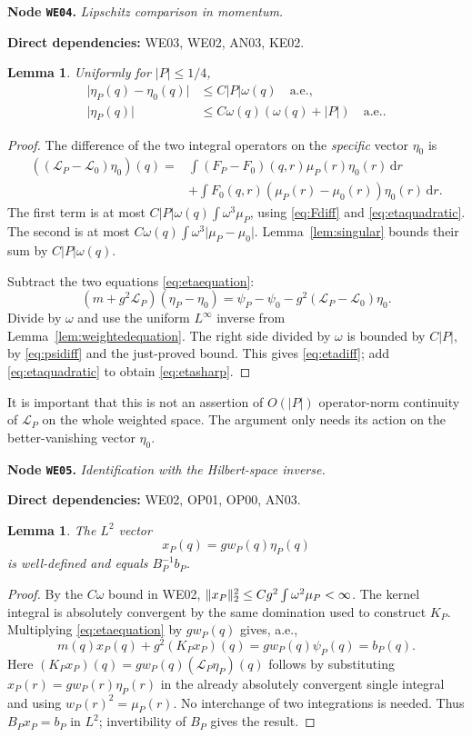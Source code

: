 \documentclass[11pt,a4paper]{article}
\newtheorem{lemma}[theorem]{Lemma}
\theoremstyle{remark}\newtheorem{remark}[theorem]{Remark}
\newcommand{\abs}[1]{\lvert #1\rvert}\newcommand{\rankone}[2]{\lvert #1\rangle\langle #2\rvert}
\newcommand{\dd}{\,\mathrm d}\newcommand{\almosteverywhere}{\text{a.e.}}
\newcommand{\node}[3]{\par\Needspace{6\baselineskip}\smallskip\hypertarget{node:#1}{}\label{nodepage:#1}\noindent\textbf{Node \texttt{#1}.} \textit{#2.}\par\noindent\textbf{Direct dependencies:} #3.\par}
\begin{document}
\node{WE04}{Lipschitz comparison in momentum}{WE03, WE02, AN03, KE02}
\begin{lemma}\label{lem:etacomparison}
Uniformly for $\abs P\leq1/4$,
\begin{align}
 \abs{\eta_P(q)-\eta_0(q)}&\leq C\abs P\omega(q)\quad\almosteverywhere,\label{eq:etadiff}\\
 \abs{\eta_P(q)}&\leq C\omega(q)(\omega(q)+\abs P)\quad\almosteverywhere.\label{eq:etasharp}
\end{align}
\end{lemma}
\begin{proof}
The difference of the two integral operators on the \emph{specific} vector $\eta_0$ is
\begin{align*}
 ((\mathcal L_P-\mathcal L_0)\eta_0)(q)
 ={}&\int(F_P-F_0)(q,r)\mu_P(r)\eta_0(r)\dd r\\
 &+\int F_0(q,r)(\mu_P(r)-\mu_0(r))\eta_0(r)\dd r.
\end{align*}
The first term is at most $C\abs P\omega(q)\int\omega^3\mu_P$, using \eqref{eq:Fdiff} and \eqref{eq:etaquadratic}. The second is at most $C\omega(q)\int\omega^3\abs{\mu_P-\mu_0}$. Lemma~\ref{lem:singular} bounds their sum by $C\abs P\omega(q)$.

Subtract the two equations \eqref{eq:etaequation}:
\[
 (m+g^2\mathcal L_P)(\eta_P-\eta_0)
 =\psi_P-\psi_0-g^2(\mathcal L_P-\mathcal L_0)\eta_0.
\]
Divide by $\omega$ and use the uniform $L^\infty$ inverse from Lemma~\ref{lem:weightedequation}. The right side divided by $\omega$ is bounded by $C\abs P$, by \eqref{eq:psidiff} and the just-proved bound. This gives \eqref{eq:etadiff}; add \eqref{eq:etaquadratic} to obtain \eqref{eq:etasharp}.
\end{proof}
It is important that this is not an assertion of $O(\abs P)$ operator-norm continuity of $\mathcal L_P$ on the whole weighted space. The argument only needs its action on the better-vanishing vector $\eta_0$.

\node{WE05}{Identification with the Hilbert-space inverse}{WE02, OP01, OP00, AN03}
\begin{lemma}\label{lem:identifyinverse}
The $L^2$ vector
\[
 x_P(q)=g w_P(q)\eta_P(q)
\]
is well-defined and equals $B_P^{-1}b_P$.
\end{lemma}
\begin{proof}
By the $C\omega$ bound in WE02, $\lVert x_P\rVert_2^2\leq Cg^2\int\omega^2\mu_P<\infty$. The kernel integral is absolutely convergent by the same domination used to construct $K_P$. Multiplying \eqref{eq:etaequation} by $g w_P(q)$ gives, a.e.,
\[
 m(q)x_P(q)+g^2(K_Px_P)(q)=g w_P(q)\psi_P(q)=b_P(q).
\]
Here $(K_Px_P)(q)=g w_P(q)(\mathcal L_P\eta_P)(q)$ follows by substituting $x_P(r)=g w_P(r)\eta_P(r)$ in the already absolutely convergent single integral and using $w_P(r)^2=\mu_P(r)$. No interchange of two integrations is needed. Thus $B_Px_P=b_P$ in $L^2$; invertibility of $B_P$ gives the result.
\end{proof}
\end{document}
